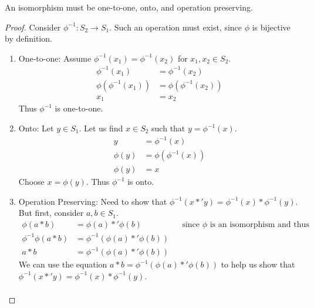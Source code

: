 \documentclass{article}
\begin{document}
\begin{enumerate}
{        An isomorphism must be one-to-one, onto, and operation preserving.
        \begin{proof}
            Consider $\phi^{-1}: S_2 \rightarrow S_1$. Such an operation must exist, since $\phi$ is bijective by definition.
            \begin{enumerate}[1.]
                \item One-to-one: Assume $\phi^{-1}(x_1) = \phi^{-1}(x_2)$ for $x_1,x_2 \in S_2$.
                      \begin{align*}
                          \phi^{-1}(x_1)       & = \phi^{-1}(x_2)       \\
                          \phi(\phi^{-1}(x_1)) & = \phi(\phi^{-1}(x_2)) \\
                          x_1                  & = x_2
                      \end{align*}
                      Thus $\phi^{-1}$ is one-to-one.
                \item Onto: Let $y \in S_1$. Let us find $x \in S_2$ such that $y = \phi^{-1}(x)$.
                      \begin{align*}
                          y       & = \phi^{-1}(x)       \\
                          \phi(y) & = \phi(\phi^{-1}(x)) \\
                          \phi(y) & = x
                      \end{align*}
                      Choose $x = \phi(y)$. Thus $\phi^{-1}$ is onto.
                \item Operation Preserving: Need to show that $\phi^{-1}(x*'y) = \phi^{-1}(x) * \phi^{-1}(y)$. But first, consider $a,b \in S_1$.
                      \begin{align*}
                          \phi(a*b)          & = \phi(a) *' \phi(b)            &  & \text{since $\phi$ is an isomorphism and thus operation preserving} \\
                          \phi^{-1}\phi(a*b) & = \phi^{-1}(\phi(a) *' \phi(b))                                                                          \\
                          a*b                & = \phi^{-1}(\phi(a) *' \phi(b))
                      \end{align*}
                      We can use the equation $a*b = \phi^{-1}(\phi(a) *' \phi(b))$ to help us show that $\phi^{-1}(x*'y) = \phi^{-1}(x) * \phi^{-1}(y)$.
                      \begin{align*}

\end{align*}
\end{enumerate}
\end{proof}}
\end{enumerate}
\end{document}
